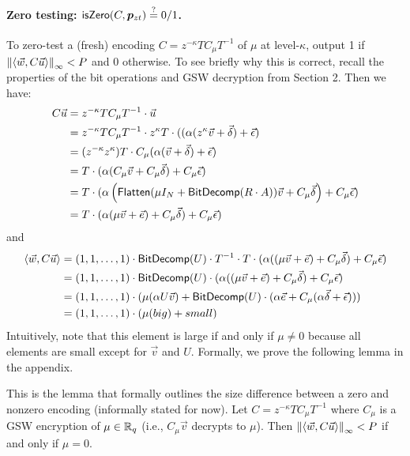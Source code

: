 \paragraph{Zero testing:  $\mathsf{isZero}(C, \bm{p}_{zt}) \stackrel{?}{=} 0/1$.}  To zero-test a (fresh) encoding $C = z^{-\kappa} T C_\mu T^{-1}$ of $\mu$ at level-$\kappa$, output 1 if $\left\lVert\left<\vec{w}, C\vec{u}\right>\right\rVert_\infty < P$ and 0 otherwise.  To see briefly why this is correct, recall the properties of the bit operations and GSW decryption from Section 2.  Then we have:
\begin{align*}
C\vec{u} &= z^{-\kappa} T C_\mu T^{-1} \cdot \vec{u}\\
&= z^{-\kappa} T C_\mu  T^{-1} \cdot z^\kappa T\cdot ((\alpha(z^\kappa\vec{v} + \vec{\delta}) + \vec{\epsilon})\\
&= (z^{-\kappa} z^{\kappa}) T \cdot C_\mu (\alpha(\vec{v} + \vec{\delta}) + \vec{\epsilon})\\
&= T \cdot (\alpha(C_\mu\vec{v} + C_\mu\vec{\delta}) + C_\mu\vec{\epsilon})\\
&= T \cdot (\alpha\left(\mathsf{Flatten}(\mu I_{N} + \mathsf{BitDecomp}(R\cdot A))\vec{v} + C_\mu\vec{\delta}\right) + C_\mu\vec{\epsilon})\\
&= T \cdot (\alpha(\mu \vec{v} + \vec{e}) + C_\mu\vec{\delta}) + C_\mu\vec{\epsilon})
\end{align*}
and
\begin{align*}
\left<\vec{w}, C\vec{u}\right> &= (1,1,\ldots,1)\cdot\mathsf{BitDecomp}(U)\cdot T^{-1}\cdot T \cdot (\alpha((\mu \vec{v} + \vec{e}) + C_\mu\vec{\delta}) + C_\mu\vec{\epsilon})\\
&= (1,1,\ldots,1)\cdot\mathsf{BitDecomp}(U) \cdot (\alpha((\mu \vec{v} + \vec{e}) + C_\mu\vec{\delta}) + C_\mu\vec{\epsilon})\\
&= (1,1,\ldots,1)\cdot(\mu(\alpha U \vec{v}) + \mathsf{BitDecomp}(U)\cdot (\alpha\vec{e} + C_\mu(\alpha\vec{\delta} + \vec{\epsilon})))\\
&= (1,1,\ldots,1)\cdot(\mu(big) + small)
\end{align*} 
Intuitively, note that this element is large if and only if $\mu \not= 0$ because all elements are small except for $\vec{v}$ and $U$.  Formally, we prove the following lemma in the appendix.

\begin{lemma}
\label{zerotesting}
This is the lemma that formally outlines the size difference between a zero and nonzero encoding (informally stated for now).  Let $C = z^{-\kappa} TC_\mu T^{-1}$ where $C_\mu$ is a GSW encryption of $\mu \in \mathbb{R}_q$ (i.e., $C_\mu\vec{v}$ decrypts to $\mu$).  Then $\left\lVert\left<\vec{w}, C\vec{u}\right>\right\rVert_\infty < P$ if and only if $\mu = 0$.
\end{lemma}

